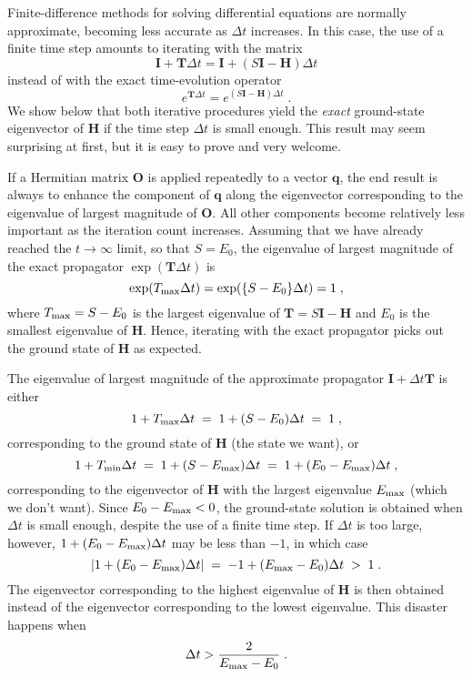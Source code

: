 \documentclass{article}
\newcommand{\bq}{\boldsymbol{q}}
\newcommand{\bH}{\boldsymbol{H}}
\newcommand{\bT}{\boldsymbol{T}}
\newcommand{\bI}{\boldsymbol{I}}
\newcommand{\bO}{\boldsymbol{O}}
\begin{document}
Finite-difference methods for solving differential equations are
normally approximate, becoming less accurate as $\Delta t$
increases. In this case, the use of a finite time step amounts to
iterating with the matrix
\begin{displaymath}
\bI + \bT \Delta t = \bI + (S\bI - \bH) \Delta t
\end{displaymath}
instead of with the exact time-evolution operator
\begin{displaymath}
e^{\bT \Delta t} = e^{(S\bI - \bH)\Delta t} \;.
\end{displaymath}
We show below that both iterative procedures yield the \emph{exact}
ground-state eigenvector of $\bH$ if the time step $\Delta t$ is small
enough. This result may seem surprising at first, but it is easy to
prove and very welcome.

If a Hermitian matrix $\bO$ is applied repeatedly to a vector $\bq$,
the end result is always to enhance the component of $\bq$ along the
eigenvector corresponding to the eigenvalue of largest magnitude of
$\bO$. All other components become relatively less important as the
iteration count increases. Assuming that we have already reached the
$t \rightarrow \infty$ limit, so that $S = E_0$, the eigenvalue of
largest magnitude of the exact propagator $\exp(\bT \Delta t)$ is
\begin{displaymath}
\exp (T_{\rm max} \Delta t) = \exp(\{S - E_{0}\}\Delta
t) = 1 \;,
\end{displaymath}
where $T_{\rm max} = S - E_{0}$ is the largest eigenvalue of $\bT =
S\bI - \bH$ and $E_{0}$ is the smallest eigenvalue of $\bH$. Hence,
iterating with the exact propagator picks out the ground state of
$\bH$ as expected.

The eigenvalue of largest magnitude of the approximate propagator $\bI
+ \Delta t \bT$ is either
\begin{displaymath}
1 + T_{\rm max} \Delta t \; = \; 1 + (S-E_0)\Delta t \; = \; 1 \;,
\end{displaymath}
corresponding to the ground state of $\bH$ (the state we want), or
\begin{displaymath}
1 + T_{\rm min} \Delta t \; = \; 1 + (S - E_{\rm max})\Delta t \; = \;
1 + (E_0 - E_{\rm max})\Delta t\;,
\end{displaymath}
corresponding to the eigenvector of $\bH$ with the largest eigenvalue
$E_{\rm max}$ (which we don't want). Since $E_0 - E_{\rm max} < 0$,
the ground-state solution is obtained when $\Delta t$ is small enough,
despite the use of a finite time step. If $\Delta t$ is too large,
however, $1 + (E_0 - E_{\rm max})\Delta t$ may be less than $-1$, in
which case
\begin{displaymath} 
|1 + (E_0 - E_{\rm max})\Delta t| \; = \; 
- 1 + (E_{\rm max} -E_{0})\Delta t \; > \; 1 \;.
\end{displaymath}
The eigenvector corresponding to the highest eigenvalue of $\bH$ is
then obtained instead of the eigenvector corresponding to the lowest
eigenvalue.  This disaster happens when
\begin{displaymath}
\Delta t > \frac{2}{E_{\rm max} - E_0} \;.
\end{displaymath}
\end{document}

